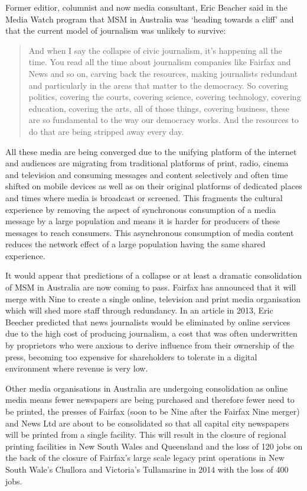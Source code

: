Former editior, columnist and now media consultant, Eric Beacher said in the Media Watch program that MSM in Australia was `heading towards a cliff' and that the current model of journalism was unlikely to survive:
\begin{quotation}
 And when I say the collapse of civic journalism, it's happening all the time. You read all the time about journalism companies like Fairfax and News and so on, carving back the resources, making journalists redundant and particularly in the areas that matter to the democracy. So covering politics, covering the courts, covering science, covering technology, covering education, covering the arts, all of those things, covering business, these are so fundamental to the way our democracy works. And the resources to do that are being stripped away every day.\cite{RefWorks:456}
\end{quotation}

 All these media are being converged due to the unifying platform of the internet and audiences are migrating from traditional platforms of print, radio, cinema and television and consuming messages and content selectively and often time shifted on mobile devices as well as on their original platforms of dedicated places and times where media is broadcast or screened. This fragments the cultural experience by removing the aspect of synchronous consumption of a media message by a large population and means it is harder for producers of these messages to reach consumers. This asynchronous consumption of media content reduces the network effect of a large population having the same shared experience. 

It would appear that predictions of a collapse or at least a dramatic consolidation of MSM in Australia are now coming to pass. Fairfax has announced that it will merge with Nine to create a single online, television and print media organisation which will shed  more staff through redundancy. In an article in 2013, Eric Beecher predicted that news journalists would be eliminated by online services due to the high cost of producing journalism, a cost that was often underwritten by proprietors who were anxious to derive influence from their ownership of the press, becoming too expensive for shareholders to tolerate in a digital environment where revenue is very low\cite{Beecher2013}. 

Other media organisations in Australia are undergoing consolidation as online media means fewer newspapers are being purchased and therefore fewer need to be printed, the presses of Fairfax (soon to be Nine after the Fairfax Nine merger) and News Ltd are about to be consolidated so that all capital city newspapers will be printed from a single facility\cite{Fairfax2018}. This will result in the closure of regional printing facilities in New South Wales and Queensland and the loss of 120 jobs\cite{Duke2018} on the back of the closure of Fairfax's large scale legacy print operations in New South Wale's Chullora and Victoria's Tullamarine in 2014 with the loss of 400 jobs\cite{proprint2014}.


